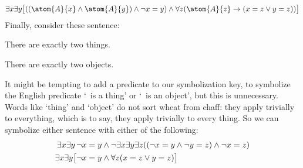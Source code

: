 $$\exists x\exists y\bigl[((\atom{A}{x} \eand \atom{A}{y}) \eand \enot x = y) \eand \forall z(\atom{A}{z} \eif ( x= z \eor y = z))\bigr]$$
Finally, consider these sentence:
\begin{earg}
\item[\ex{exactly2things}] There are exactly two things.
\item[\ex{exactly2objects}] There are exactly two objects.
\end{earg}
It might be tempting to add a predicate to our symbolization key, to symbolize the English predicate `\blank\ is a thing' or `\blank\ is an object', but this is unnecessary. Words like `thing' and `object' do not sort wheat from chaff: they apply trivially to everything, which is to say, they apply trivially to every thing. So we can symbolize either sentence with either of the following:
	\begin{align*}
		\exists x \exists y\,\neg x = y & \wedge  \neg \exists x \exists y \exists z ((\neg x = y \wedge \neg y = z) \wedge \neg x = z) \\
		\exists x \exists y \bigl[\neg x = y & \wedge \forall z(x=z \vee y = z)\bigr]
	\end{align*}

\practiceproblems


